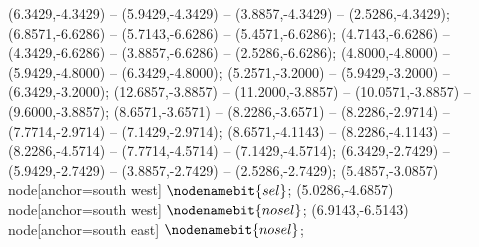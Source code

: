    (6.3429,-4.3429) -- (5.9429,-4.3429) -- (3.8857,-4.3429) -- (2.5286,-4.3429);
   (6.8571,-6.6286) -- (5.7143,-6.6286) -- (5.4571,-6.6286);
   (4.7143,-6.6286) -- (4.3429,-6.6286) -- (3.8857,-6.6286) -- (2.5286,-6.6286);
   (4.8000,-4.8000) -- (5.9429,-4.8000) -- (6.3429,-4.8000);
   (5.2571,-3.2000) -- (5.9429,-3.2000) -- (6.3429,-3.2000);
   (12.6857,-3.8857) -- (11.2000,-3.8857) -- (10.0571,-3.8857) -- (9.6000,-3.8857);
   (8.6571,-3.6571) -- (8.2286,-3.6571) -- (8.2286,-2.9714) -- (7.7714,-2.9714) -- (7.1429,-2.9714);
   (8.6571,-4.1143) -- (8.2286,-4.1143) -- (8.2286,-4.5714) -- (7.7714,-4.5714) -- (7.1429,-4.5714);
   (6.3429,-2.7429) -- (5.9429,-2.7429) -- (3.8857,-2.7429) -- (2.5286,-2.7429);
   (5.4857,-3.0857) node[anchor=south west] {$\nodenamebit{sel}$};
   (5.0286,-4.6857) node[anchor=south west] {$\nodenamebit{nosel}$};
   (6.9143,-6.5143) node[anchor=south east] {$\nodenamebit{nosel}$};
